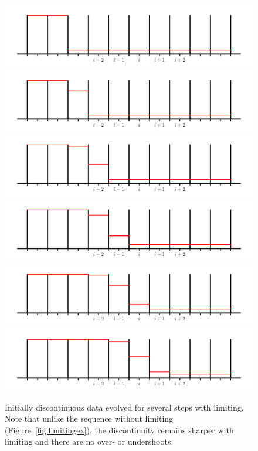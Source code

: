 \begin{figure}[h]
\centering
\includegraphics[width=0.75\linewidth]{rea-start_001} \\
\includegraphics[width=0.75\linewidth]{rea-start_002} \\
\includegraphics[width=0.75\linewidth]{rea-start_003} \\
\includegraphics[width=0.75\linewidth]{rea-start_004} \\
\includegraphics[width=0.75\linewidth]{rea-start_005} \\
\includegraphics[width=0.75\linewidth]{rea-start_006}
\caption[The effect of limiters on initially discontinuous
  data.]{\label{fig:limitingexb}Initially discontinuous data evolved
  for several steps with limiting.  Note that unlike the sequence
  without limiting (Figure~\ref{fig:limitingex}), the
  discontinuity remains sharper with limiting and there are no over-
  or undershoots.}
\end{figure}

